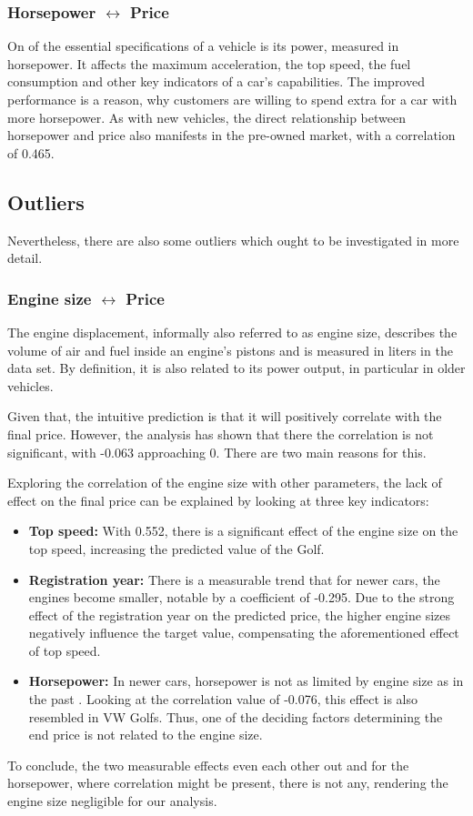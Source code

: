 \subsubsection{Horsepower $\leftrightarrow$ Price}
On of the essential specifications of a vehicle is its power, measured in horsepower.
It affects the maximum acceleration, the top speed, the fuel consumption and other key indicators of a car's capabilities.
The improved performance is a reason, why customers are willing to spend extra for a car with more horsepower.
As with new vehicles, the direct relationship between horsepower and price also manifests in the pre-owned market, %
with a correlation of 0.465.
\subsection{Outliers}
Nevertheless, there are also some outliers which ought to be investigated in more detail.
\subsubsection{Engine size $\leftrightarrow$ Price}
The engine displacement, informally also referred to as engine size, describes the volume of air and fuel inside an engine's pistons \autocite{EngineDisplacement2024}
and is measured in liters in the data set.
By definition, it is also related to its power output, in particular in older vehicles.
\par
Given that, the intuitive prediction is that it will positively correlate with the final price.
However, the analysis has shown that there the correlation is not significant, with -0.063 approaching 0.
There are two main reasons for this.
\par
Exploring the correlation of the engine size with other parameters, the lack of effect on the final price can be explained by looking at
three key indicators:
\begin{itemize}
    \item \textbf{Top speed: }
          With 0.552, there is a significant effect of the engine size on the top speed, increasing the predicted value of the Golf.
    \item \textbf{Registration year: }
          There is a measurable trend that for newer cars, the engines become smaller, notable by a coefficient of -0.295.
          Due to the strong effect of the registration year on the predicted price, the higher engine sizes negatively influence the target value,
          compensating the aforementioned effect of top speed.
    \item \textbf{Horsepower: }
          In newer cars, horsepower is not as limited by engine size as in the past \autocite{WhatEngineDisplacement}.
          Looking at the correlation value of -0.076, this effect is also resembled in VW Golfs. Thus, one of the deciding factors determining the end price
          is not related to the engine size.
\end{itemize}
To conclude, the two measurable effects even each other out and for the horsepower, where correlation might be present, there is not any, rendering the
engine size negligible for our analysis. %
